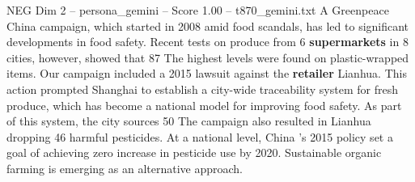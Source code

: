 \begin{textsample}{NEG Dim 2 – persona\_gemini – Score 1.00 – t870\_gemini.txt}  \label{ex:f2_neg_008}
A Greenpeace China campaign, which started in 2008 amid food scandals, has led to significant developments in food safety.
Recent tests on produce from 6 \textbf{supermarkets} in 8 cities, however, showed that 87 %
The highest levels were found on plastic-wrapped items.
Our campaign included a 2015 lawsuit against the \textbf{retailer} Lianhua.
This action prompted Shanghai to establish a city-wide traceability system for fresh produce, which has become a national model for improving food safety.
As part of this system, the city sources 50 %
The campaign also resulted in Lianhua dropping 46 harmful pesticides.
At a national level, China ’s 2015 policy set a goal of achieving zero increase in pesticide use by 2020.
Sustainable organic farming is emerging as an alternative approach.

\end{textsample}
